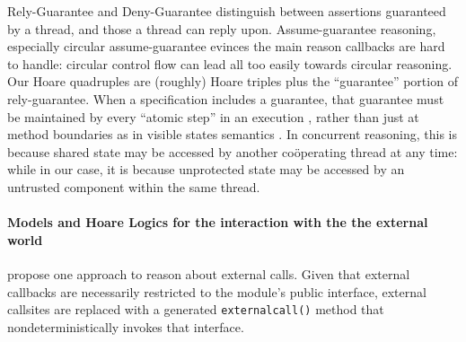 Rely-Guarantee
\cite{relyGuarantee-HayesJones-setss2017,relyGuarantee-vanStaden-mpc2015}
and Deny-Guarantee \cite{DenyGuarantee} %
distinguish between assertions guaranteed by a thread, and those a
thread can reply upon. 
Assume-guarantee
reasoning, especially circular
assume-guarantee  \cite{circular-assume-guarantee-fm2015} evinces
the main reason callbacks
are hard to handle: circular control flow can lead
all too easily towards circular reasoning.
Our Hoare quadruples are (roughly) Hoare triples plus 
the ``guarantee'' portion of rely-guarantee.
When a
specification includes a guarantee, that guarantee must be maintained
by every ``atomic step'' in an execution
\cite{relyGuarantee-HayesJones-setss2017}, rather than just at method
boundaries as in visible states semantics
\cite{MuellerPoetzsch-HeffterLeavens06,DrossoFrancaMuellerSummers08,considerate}.
In concurrent reasoning,  
this is because shared state may be accessed
by another co{\"o}perating thread at any time:
while in our case, it is because unprotected
state may be accessed by an untrusted component within the same
thread.  

\paragraph{Models and Hoare Logics for the interaction with the the external world}
 \citet{CassezFQ24} propose one approach to reason about external calls.
Given that external callbacks are necessarily restricted to the module's public interface,
external callsites are replaced  with a
generated \texttt{externalcall()} method that  nondeterministically invokes that interface.
 


